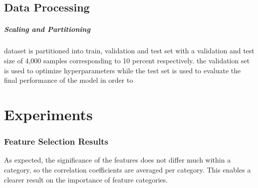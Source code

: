 \documentclass[12pt, a4paper, headinclude, twoside, plainheadsepline, open=right, numbers=noenddot, hidelinks, toc=listof, toc=bibliography]{scrreprt}
\begin{document}
\section{Data Processing}
\label{sec:data_processing}


\paragraph{Scaling and Partitioning}
dataset is partitioned into train, validation and test set with a validation and test size of 4,000 samples corresponding to 10 percent respectively.
the validation set is used to optimize hyperparameters while the test set is used to evaluate the final performance of the model
in order to 



\chapter{Experiments}
\label{chap:experiments}

\subsection{Feature Selection Results}
\label{ssec:feature_selection_results}

As expected, the significance of the features does not differ much within a category, so the correlation coefficients are averaged per category.
This enables a clearer result on the importance of feature categories.
\end{document}
